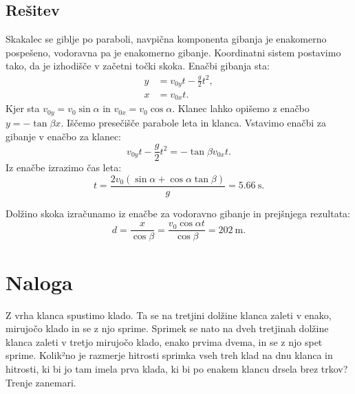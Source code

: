 \documentclass[a4,11pt]{article}
\begin{document}
\subsection*{Rešitev}
    Skakalec se giblje po paraboli, navpična komponenta gibanja je enakomerno pospešeno, vodoravna pa je enakomerno gibanje.
    Koordinatni sistem postavimo tako, da je izhodišče v začetni točki skoka. Enačbi gibanja sta:
    \begin{align*}
        y &= v_{0y} t - \frac{g}{2}t^2, \\
        x &= v_{0x} t.
    \end{align*}
    Kjer sta \(v_{0y} = v_0 \sin\alpha\) in \(v_{0x} = v_0 \cos\alpha\).
    Klanec lahko opišemo z enačbo \(y = -\tan\beta x\). Iščemo presečišče parabole leta in klanca. Vstavimo enačbi za gibanje v enačbo za klanec:
    \[v_{0y} t - \frac{g}{2}t^2 = -\tan\beta v_{0x} t.\]
    Iz enačbe izrazimo čas leta:
    \[t = \frac{2v_0\left(\sin\alpha + \cos\alpha\tan\beta\right)}{g} = \qty{5.66}{\s}.\]

    Dolžino skoka izračunamo iz enačbe za vodoravno gibanje in prejšnjega rezultata:
    \[d = \frac{x}{\cos\beta} = \frac{v_0\cos\alpha t}{\cos\beta} = \qty{202}{\metre}.\]

\section{Naloga}
    Z vrha klanca spustimo klado. Ta se na tretjini dolžine klanca zaleti v enako, mirujočo klado
    in se z njo sprime. Sprimek se nato na dveh tretjinah dolžine klanca zaleti v tretjo mirujočo
    klado, enako prvima dvema, in se z njo spet sprime. Kolik²no je razmerje hitrosti sprimka
    vseh treh klad na dnu klanca in hitrosti, ki bi jo tam imela prva klada, ki bi po enakem
    klancu drsela brez trkov? Trenje zanemari.
\end{document}
